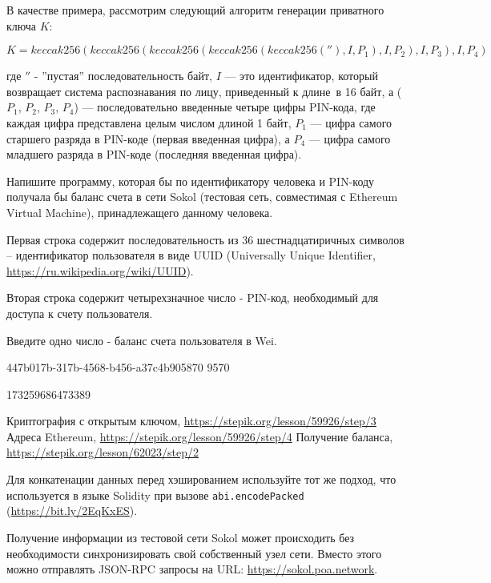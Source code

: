 В качестве примера, рассмотрим следующий алгоритм генерации приватного ключа $K$:

$$K = keccak256(keccak256(keccak256(keccak256(keccak256(''), I, P_1), I, P_2), I, P_3), I, P_4)$$ 

где $''$ - ''пустая'' последовательность байт, $I$ --- это идентификатор, который возвращает система распознавания по лицу, приведенный к длине в 16 байт, а ($P_1$, $P_2$, $P_3$, $P_4$) --- последовательно введенные четыре цифры PIN-кода, где каждая цифра представлена целым числом длиной 1 байт, $P_1$ --- цифра самого старшего разряда в PIN-коде (первая введенная цифра), а $P_4$ --- цифра самого младшего разряда в PIN-коде (последняя введенная цифра).

Напишите программу, которая бы по идентификатору человека и PIN-коду получала бы баланс счета в сети Sokol (тестовая сеть, совместимая с Ethereum Virtual Machine), принадлежащего данному человека.   


Первая строка содержит последовательность из 36 шестнадцатиричных символов –  идентификатор пользователя в виде UUID (Universally Unique Identifier, \url{https://ru.wikipedia.org/wiki/UUID}).

Вторая строка содержит четырехзначное число - PIN-код, необходимый для доступа к счету пользователя.

\outputfmtSection

Введите одно число - баланс счета пользователя в Wei.

\exampleSection


\begin{myverbbox}[\small]{\vinput}
447b017b-317b-4568-b456-a37c4b905870
9570
\end{myverbbox}
\begin{myverbbox}[\small]{\voutput}
173259686473389
\end{myverbbox}

\commentsSection
{}
{Криптография с открытым ключом, \url{https://stepik.org/lesson/59926/step/3}}
{Адреса Ethereum, \url{https://stepik.org/lesson/59926/step/4}}
{Получение баланса, \url{https://stepik.org/lesson/62023/step/2}}

Для конкатенации данных перед хэшированием используйте тот же подход, что используется в языке Solidity при вызове \texttt{abi.encodePacked} (\url{https://bit.ly/2EqKxES}). 

Получение информации из тестовой сети Sokol может происходить без необходимости синхронизировать свой собственный узел сети. Вместо этого можно отправлять JSON-RPC запросы на URL: \url{https://sokol.poa.network}. 

